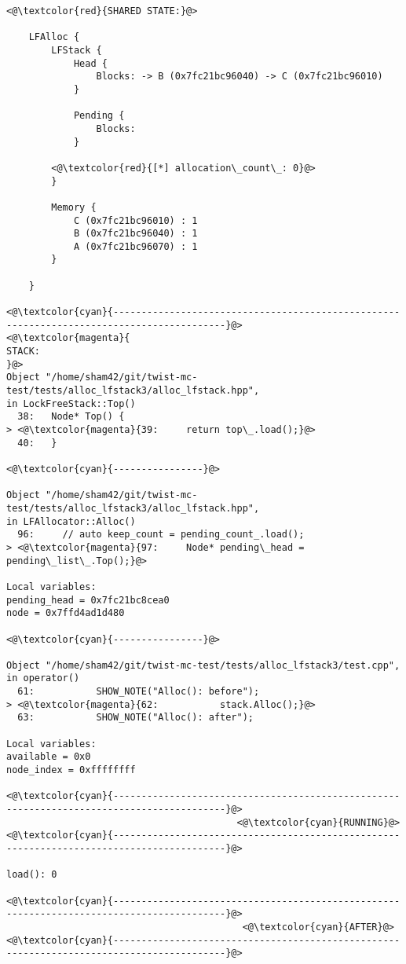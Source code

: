 \begin{adjustwidth}{-3.3cm}{-1cm}
\begin{allintypewriter}
\begin{multicols*}{2}
\begin{lstlisting}[numbers=none]
<@\textcolor{red}{SHARED STATE:}@>

    LFAlloc {
	    LFStack {
		    Head {
			    Blocks: -> B (0x7fc21bc96040) -> C (0x7fc21bc96010) 
		    }

		    Pending {
			    Blocks: 
		    }

		<@\textcolor{red}{[*] allocation\_count\_: 0}@>
	    }

	    Memory {
		    C (0x7fc21bc96010) : 1
		    B (0x7fc21bc96040) : 1
		    A (0x7fc21bc96070) : 1
	    }

    }

<@\textcolor{cyan}{------------------------------------------------------------------------------------------}@>
<@\textcolor{magenta}{
STACK:
}@>
Object "/home/sham42/git/twist-mc-test/tests/alloc_lfstack3/alloc_lfstack.hpp",
in LockFreeStack::Top()
  38:   Node* Top() {
> <@\textcolor{magenta}{39:     return top\_.load();}@>
  40:   }

<@\textcolor{cyan}{----------------}@>

Object "/home/sham42/git/twist-mc-test/tests/alloc_lfstack3/alloc_lfstack.hpp",
in LFAllocator::Alloc()
  96:     // auto keep_count = pending_count_.load();
> <@\textcolor{magenta}{97:     Node* pending\_head = pending\_list\_.Top();}@>

Local variables: 
pending_head = 0x7fc21bc8cea0
node = 0x7ffd4ad1d480

<@\textcolor{cyan}{----------------}@>

Object "/home/sham42/git/twist-mc-test/tests/alloc_lfstack3/test.cpp",
in operator()
  61:           SHOW_NOTE("Alloc(): before");
> <@\textcolor{magenta}{62:           stack.Alloc();}@>
  63:           SHOW_NOTE("Alloc(): after");

Local variables: 
available = 0x0
node_index = 0xffffffff

<@\textcolor{cyan}{------------------------------------------------------------------------------------------}@>
                                         <@\textcolor{cyan}{RUNNING}@>
<@\textcolor{cyan}{------------------------------------------------------------------------------------------}@>

load(): 0

<@\textcolor{cyan}{------------------------------------------------------------------------------------------}@>
                                          <@\textcolor{cyan}{AFTER}@>
<@\textcolor{cyan}{------------------------------------------------------------------------------------------}@>


\end{lstlisting}
\end{multicols*}
\end{allintypewriter}
\end{adjustwidth}
